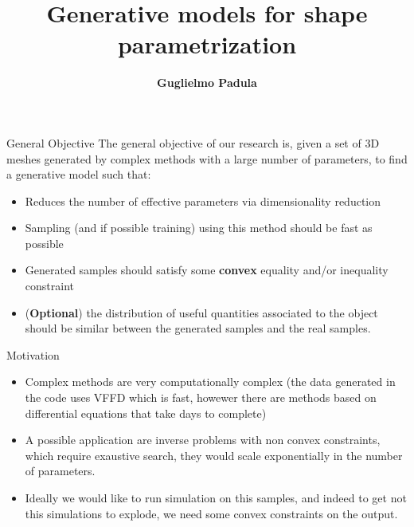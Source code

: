 \documentclass{beamer}
\title[Generative models for shape parametrization]{Generative models for shape parametrization}
\author[G. Padula]{\textbf{Guglielmo Padula}}
\institute{University of Trieste}
\date{}
\begin{document}
\begin{frame}
\titlepage
\end{frame}

\begin{frame}{General Objective}
The general objective of our research is, given a set of 3D meshes generated by complex methods with a large number of parameters, to find a generative model such that:
\begin{itemize}
\item Reduces the number of effective parameters via dimensionality reduction
\item Sampling (and if possible training)  using this method should be fast as possible
\item Generated samples should satisfy some \textbf{convex} equality and/or inequality constraint   
\item (\textbf{Optional}) the distribution of useful quantities associated to the object should be similar between the generated samples and the real samples.
\end{itemize}
\end{frame}
\begin{frame}{Motivation}
\begin{itemize}
\item Complex methods are very computationally complex (the data generated in the code uses VFFD which is fast, howewer there are methods based on differential equations that take days to complete)
\item A possible application are inverse problems with non convex constraints, which require exaustive search,  they would scale exponentially in the number of parameters.
\item Ideally we would like to run simulation on this samples, and indeed to get not this simulations to explode, we need some convex constraints on the output. 
\end{itemize}
\end{frame}
\end{document}
